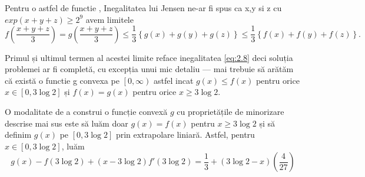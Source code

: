 \documentclass[a4paper,12pt,oneside]{report}
\begin{document}
Pentru o astfel de functie , Inegalitatea lui Jensen ne-ar fi spus ca x,y si z cu \(exp \left ( x + y + z \right )\geq  2^{9} \) avem limitele  
\begin{displaymath}
  f\left ( \frac{x + y + z}{3} \right ) = g\left ( \frac{x + y + z}{3} \right ) \leq  \frac{1}{3}\left \{ g\left ( x \right ) + g\left ( y \right ) + g\left ( z \right ) \right \} \leq  \frac{1}{3}\left \{ f\left ( x \right ) + f\left ( y \right ) + f\left ( z \right ) \right \} .
\end{displaymath}

Primul și ultimul termen al acestei limite reface inegalitatea \ref{eq:2.8} deci soluția problemei ar fi completă, cu excepția unui mic detaliu — mai trebuie să arătăm că există o functie  g convexa pe \( \left [ 0 , \infty  \right ) \) astfel incat  \(g\left ( x \right ) \leq  f\left ( x \right )\) pentru orice  \(x \in \left [ 0 , 3\log 2 \right ]\) și \( f\left ( x \right ) = g\left ( x \right )\) pentru orice \( x \geq 3\log 2\).

O modalitate de a construi o funcție convexă \(g\) cu proprietățile de minorizare descrise mai sus este să luăm doar \(g\left ( x \right ) = f\left ( x \right )\) pentru \(x \geq  3\log2\) și să definim \(g\left ( x \right )\) pe \(\left [ 0 , 3\log 2 \right ]\) prin extrapolare liniară. Astfel, pentru \(x\in \left [ 0 , 3\log 2 \right ]\), luăm
\begin{displaymath}
  g\left ( x \right ) - f\left ( 3\log 2 \right ) + \left ( x - 3\log 2 \right ){f}'\left ( 3\log2 \right ) = \frac{1}{3} + \left ( 3\log2 - x  \right )\left ( \frac{4}{27} \right )
\end{displaymath}
\end{document}
